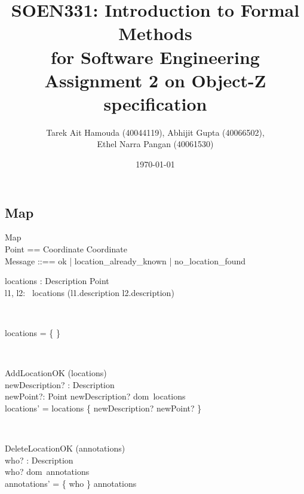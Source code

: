 \documentclass[12pt]{article}
\title{SOEN331: Introduction to Formal Methods\\for Software Engineering\\
Assignment 2 on Object-Z specification}
\author{Tarek Ait Hamouda (40044119), Abhijit Gupta (40066502),\\ 
Ethel Narra Pangan (40061530)}
\date{\today}
\begin{document}
\begin{spacing}{1.5}

\maketitle

\newpage

\section{Map}

\begin{class}{Map}
 \\
Point == Coordinate \times Coordinate \\
Message ::== ok | location\_already\_known | no\_location\_found \\
\begin{state}
locations : Description \pfun Point\\
\where
\forall l1, l2: ~locations \bullet (l1.description \neq l2.description)
\end{state} \\
\begin{init}
locations = \{ \}
\end{init} \\
\begin{op}{AddLocationOK}
\Delta (locations) \\
newDescription? : Description\\
newPoint?: Point 
\ST
newDescription? \notin dom~locations \\
locations' = locations \cup \{ newDescription? \to newPoint? \}
\end{op}\\
\begin{op}{DeleteLocationOK}
\Delta (annotations) \\
who? : Description\\
\ST
who? \in dom~annotations\\
annotations' = \{ who \} \ndres annotations
\end{op}\\
\begin{op}{ModifyLocationsOK}
\Delta (annotations) \\
description? : Description\\
coordinates? : Point
\ST


}
\end{op}\\
\end{class}





\end{spacing}
\end{document}
